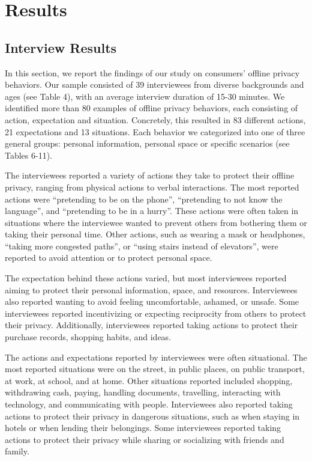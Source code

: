 \section{Results}
\label{sec:4}

\subsection{Interview Results}
\label{Label2}

In this section, we report the findings of our study on consumers' offline privacy behaviors. Our sample consisted of 39 interviewees from diverse backgrounds and ages (see Table 4), with an average interview duration of 15-30 minutes. We identified more than 80 examples of offline privacy behaviors, each consisting of action, expectation and situation. Concretely, this resulted in 83 different actions, 21 expectations and 13 situations. Each behavior we categorized into one of three general groups: personal information, personal space or specific scenarios (see Tables 6-11). 

The interviewees reported a variety of actions they take to protect their offline privacy, ranging from physical actions to verbal interactions. The most reported actions were “pretending to be on the phone”, “pretending to not know the language”, and “pretending to be in a hurry”. These actions were often taken in situations where the interviewee wanted to prevent others from bothering them or taking their personal time. Other actions, such as wearing a mask or headphones, “taking more congested paths”, or “using stairs instead of elevators”, were reported to avoid attention or to protect personal space. 

The expectation behind these actions varied, but most interviewees reported aiming to protect their personal information, space, and resources. Interviewees also reported wanting to avoid feeling uncomfortable, ashamed, or unsafe. Some interviewees reported incentivizing or expecting reciprocity from others to protect their privacy. Additionally, interviewees reported taking actions to protect their purchase records, shopping habits, and ideas. 

The actions and expectations reported by interviewees were often situational. The most reported situations were on the street, in public places, on public transport, at work, at school, and at home. Other situations reported included shopping, withdrawing cash, paying, handling documents, travelling, interacting with technology, and communicating with people. Interviewees also reported taking actions to protect their privacy in dangerous situations, such as when staying in hotels or when lending their belongings. Some interviewees reported taking actions to protect their privacy while sharing or socializing with friends and family. 

